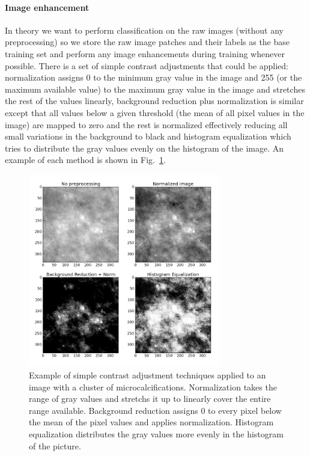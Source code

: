 \paragraph{Image enhancement}
In theory we want to perform classification on the raw images (without any preprocessing) so we store the raw image patches and their labels as the base training set and perform any image enhancements during training whenever possible. There is a set of simple contrast adjustments that could be applied: normalization assigns 0 to the minimum gray value in the image and 255 (or the maximum available value) to the maximum gray value in the image and stretches the rest of the values linearly, background reduction plus normalization is similar except that all values below a given threshold (the mean of all pixel values in the image) are mapped to zero and the rest is normalized effectively reducing all small variations in the background to black and histogram equalization which tries to distribute the gray values evenly on the histogram of the image. An example of each method is shown in Fig.~\ref{fig:PreprocessingTechniques}.
\begin{figure}[h!]
	\centering
	\includegraphics [width = 0.75\textwidth]{plots/mcDiffPreprocessings.png}
	\caption[Example of constrast adjustment techniques]{Example of simple contrast adjustment techniques applied to an image with a cluster of microcalcifications. Normalization takes the range of gray values and stretchs it up to linearly cover the entire range available. Background reduction assigns 0 to every pixel below the mean of the pixel values and applies normalization. Histogram equalization distributes the gray values more evenly in the histogram of the picture.}
	\label{fig:PreprocessingTechniques}
\end{figure}

